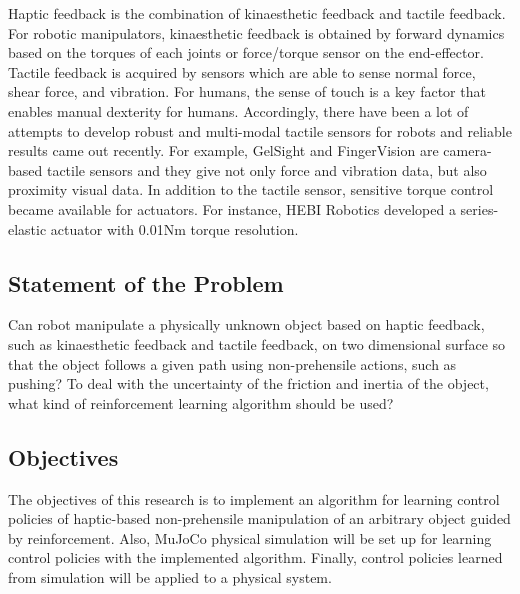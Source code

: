\documentclass{article}
\begin{document}
Haptic feedback is the combination of kinaesthetic feedback and tactile feedback. For robotic manipulators, kinaesthetic feedback is obtained by forward dynamics based on the torques of each joints or force/torque sensor on the end-effector. Tactile feedback is acquired by sensors which are able to sense normal force, shear force, and vibration. For humans, the sense of touch is a key factor that enables manual dexterity for humans. Accordingly, there have been a lot of attempts to develop robust and multi-modal tactile sensors for robots and reliable results came out recently. For example, GelSight and FingerVision are camera-based tactile sensors and they give not only force and vibration data, but also proximity visual data. In addition to the tactile sensor, sensitive torque control became available for actuators. For instance, HEBI Robotics developed a series-elastic actuator with 0.01Nm torque resolution.

\subsection{Statement of the Problem}

Can robot manipulate a physically unknown object based on haptic feedback, such as kinaesthetic feedback and tactile feedback, on two dimensional surface so that the object follows a given path using non-prehensile actions, such as pushing? To deal with the uncertainty of the friction and inertia of the object, what kind of reinforcement learning algorithm should be used?

\subsection{Objectives}

The objectives of this research is to implement an algorithm for learning control policies of haptic-based non-prehensile manipulation of an arbitrary object guided by reinforcement. Also, MuJoCo physical simulation will be set up for learning control policies with the implemented algorithm. Finally, control policies learned from simulation will be applied to a physical system.

\end{document}
